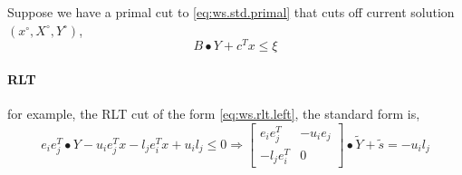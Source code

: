 \documentclass[../main]{subfiles}
\begin{document}
Suppose we have a primal cut to \eqref{eq:ws.std.primal}
that cuts off current solution \((x^\circ, X^\circ, Y^\circ)\),
\begin{equation*}
    B\bullet Y + c^T x \le \xi
\end{equation*}
\paragraph{RLT} for example, the RLT cut of the form \eqref{eq:ws.rlt.left}, the standard form is,
\begin{equation*}
    e_ie_j^T\bullet Y - u_i e_j^Tx - l_j e_i^Tx + u_i l_j \le 0
    \Rightarrow \begin{bmatrix} e_ie_j^T  & - u_i e_j \\ - l_j e_i^T & 0 \end{bmatrix}
    \bullet \tilde Y + \tilde s = - u_il_j
\end{equation*}
\end{document}
